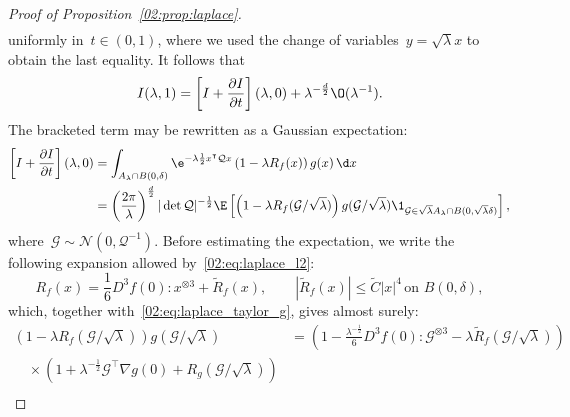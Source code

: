 \begin{proof}[Proof of Proposition~\ref{02:prop:laplace}]
\begin{equation}
\begin{aligned}
                \end{aligned}
            \end{equation}
            uniformly in~$t\in(0,1)$, where we used the change of variables~$y=\sqrt\lambda x$ to obtain the last equality.
            It follows that
            \begin{equation}
                \label{02:eq:laplace_expansion}
                I(\lambda,1) = \left[I + \frac{\partial I}{\partial t}\right](\lambda,0) + \lambda^{-\frac d2}\O(\lambda^{-1}).
            \end{equation}
            The bracketed term may be rewritten as a Gaussian expectation:
            \begin{equation}
                \begin{aligned}
                    \left[I + \frac{\partial I}{\partial t}\right](\lambda,0) &= \int_{A_\lambda \cap B(0,\delta)} \e^{-\lambda \frac12 x^\intercal \mathcal Q x}\left(1 - \lambda R_f(x)\right)g(x)\, \d x\\
                    &= \left(\frac{2\pi}{\lambda}\right)^{\frac d2}|\det \mathcal Q|^{-\frac12}\E\left[\left(1-\lambda R_f({\mathcal G}/\sqrt\lambda)\right)g({\mathcal G}/\sqrt\lambda)\1_{{\mathcal G} \in \sqrt\lambda A_\lambda \cap B(0,\sqrt\lambda \delta)}\right],
                \end{aligned}
            \end{equation}
            where~${\mathcal G}\sim\mathcal N(0,\mathcal Q^{-1})$.
            Before estimating the expectation, we write the following expansion allowed by~\eqref{02:eq:laplace_l2}:
            \begin{equation}
                \label{02:eq:laplace_taylor_f2}
                R_f(x) = \frac 16 D^3 f(0):x^{\otimes 3} + \widetilde R_f(x),\qquad \left|\widetilde R_f(x)\right|\leq \widetilde C |x|^4\, \text{on }B(0,\delta),
            \end{equation}
            which, together with~\eqref{02:eq:laplace_taylor_g}, gives almost surely:
            \begin{equation}
                \begin{aligned}
                    \left(1-\lambda R_f({\mathcal G}/\sqrt\lambda)\right)g({\mathcal G}/\sqrt\lambda) &= \left(1- \frac {\lambda^{-\frac12}}6 D^3 f(0):{\mathcal G}^{\otimes 3} - \lambda\widetilde R_f({\mathcal G}/\sqrt\lambda)\right)\\
                    \quad\times\left(1 + \lambda^{-\frac12}{\mathcal G}^\intercal \nabla g(0) + R_g({\mathcal G}/\sqrt\lambda)\right)\\

\end{aligned}
\end{equation}
\end{proof}
